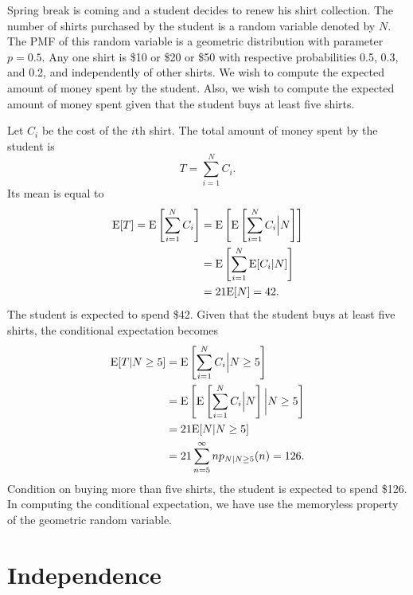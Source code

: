 \begin{example}
Spring break is coming and a student decides to renew his shirt collection.
The number of shirts purchased by the student is a random variable denoted by $N$.
The PMF of this random variable is a geometric distribution with parameter $p = 0.5$.
Any one shirt is \$10 or \$20 or \$50 with respective probabilities 0.5, 0.3, and 0.2, and independently of other shirts.
We wish to compute the expected amount of money spent by the student.
Also, we wish to compute the expected amount of money spent given that the student buys at least five shirts.

Let $C_i$ be the cost of the $i$th shirt.
The total amount of money spent by the student is
\begin{equation*}
T = \sum_{i=1}^N C_i .
\end{equation*}
Its mean is equal to
\begin{equation*}
\begin{split}
\mathrm{E} [T] = \mathrm{E} \left[ \sum_{i=1}^N C_i \right]
&= \mathrm{E} \left[ \mathrm{E} \left[
\sum_{i=1}^N C_i \Big| N \right] \right] \\
&= \mathrm{E} \left[ \sum_{i=1}^N \mathrm{E} [ C_i | N ] \right] \\
&= 21 \mathrm{E} [ N ] = 42.
\end{split}
\end{equation*}
The student is expected to spend \$42.
Given that the student buys at least five shirts, the conditional expectation becomes
\begin{equation*}
\begin{split}
\mathrm{E} [T | N \geq 5]
&= \mathrm{E} \left[ \sum_{i=1}^N C_i \Big| N \geq 5 \right] \\
&= \mathrm{E} \left[ \mathrm{E} \left[
\sum_{i=1}^N C_i \Big| N \right] \bigg| N \geq 5 \right] \\
&= 21 \mathrm{E} [ N | N \geq 5] \\
&= 21 \sum_{n=5}^{\infty} n p_{N | N \geq 5} (n)
= 126 .
\end{split}
\end{equation*}
Condition on buying more than five shirts, the student is expected to spend \$126.
In computing the conditional expectation, we have use the memoryless property of the geometric random variable.
\end{example}


\section{Independence}

